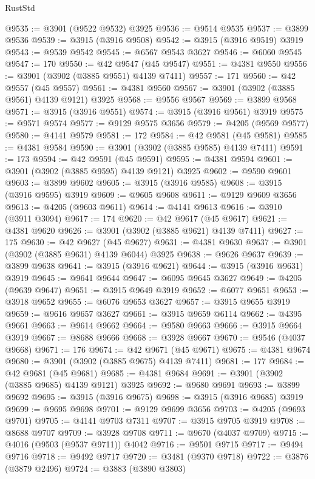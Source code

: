 \begin{lexlean}{RustStd}
\begin{coremodule}
@9535 := @3901 (@9522 @9532) @3925
@9536 := @9514 @9535
@9537 := @3899 @9536
@9539 := @3915 (@3916 @9508)
@9542 := @3915 (@3916 @9519) @3919
@9543 := @9539 @9542
@9545 := @6567 @9543 @3627
@9546 := @6060 @9545
@9547 := 170
@9550 := @42 @9547 (@45 @9547)
@9551 := @4381 @9550
@9556 := @3901 (@3902 (@3885 @9551) @4139 @7411)
@9557 := 171
@9560 := @42 @9557 (@45 @9557)
@9561 := @4381 @9560
@9567 := @3901 (@3902 (@3885 @9561) @4139 @9121) @3925
@9568 := @9556 @9567
@9569 := @3899 @9568
@9571 := @3915 (@3916 @9551)
@9574 := @3915 (@3916 @9561) @3919
@9575 := @9571 @9574
@9577 := @9129 @9575 @3656
@9579 := @4205 (@9569 @9577)
@9580 := @4141 @9579
@9581 := 172
@9584 := @42 @9581 (@45 @9581)
@9585 := @4381 @9584
@9590 := @3901 (@3902 (@3885 @9585) @4139 @7411)
@9591 := 173
@9594 := @42 @9591 (@45 @9591)
@9595 := @4381 @9594
@9601 := @3901 (@3902 (@3885 @9595) @4139 @9121) @3925
@9602 := @9590 @9601
@9603 := @3899 @9602
@9605 := @3915 (@3916 @9585)
@9608 := @3915 (@3916 @9595) @3919
@9609 := @9605 @9608
@9611 := @9129 @9609 @3656
@9613 := @4205 (@9603 @9611)
@9614 := @4141 @9613
@9616 := @3910 (@3911 @3094)
@9617 := 174
@9620 := @42 @9617 (@45 @9617)
@9621 := @4381 @9620
@9626 := @3901 (@3902 (@3885 @9621) @4139 @7411)
@9627 := 175
@9630 := @42 @9627 (@45 @9627)
@9631 := @4381 @9630
@9637 := @3901 (@3902 (@3885 @9631) @4139 @6044) @3925
@9638 := @9626 @9637
@9639 := @3899 @9638
@9641 := @3915 (@3916 @9621)
@9644 := @3915 (@3916 @9631) @3919
@9645 := @9641 @9644
@9647 := @6095 @9645 @3627
@9649 := @4205 (@9639 @9647)
@9651 := @3915 @9649 @3919
@9652 := @6077 @9651
@9653 := @3918 @9652
@9655 := @6076 @9653 @3627
@9657 := @3915 @9655 @3919
@9659 := @9616 @9657 @3627
@9661 := @3915 @9659 @6114
@9662 := @4395 @9661
@9663 := @9614 @9662
@9664 := @9580 @9663
@9666 := @3915 @9664 @3919
@9667 := @8688 @9666
@9668 := @3928 @9667
@9670 := @9546 (@4037 @9668)
@9671 := 176
@9674 := @42 @9671 (@45 @9671)
@9675 := @4381 @9674
@9680 := @3901 (@3902 (@3885 @9675) @4139 @7411)
@9681 := 177
@9684 := @42 @9681 (@45 @9681)
@9685 := @4381 @9684
@9691 := @3901 (@3902 (@3885 @9685) @4139 @9121) @3925
@9692 := @9680 @9691
@9693 := @3899 @9692
@9695 := @3915 (@3916 @9675)
@9698 := @3915 (@3916 @9685) @3919
@9699 := @9695 @9698
@9701 := @9129 @9699 @3656
@9703 := @4205 (@9693 @9701)
@9705 := @4141 @9703 @7311
@9707 := @3915 @9705 @3919
@9708 := @8688 @9707
@9709 := @3928 @9708
@9711 := @9670 (@4037 @9709)
@9715 := @4016 (@9503 (@9537 @9711)) @4042
@9716 := @9501 @9715
@9717 := @9494 @9716
@9718 := @9492 @9717
@9720 := @3481 (@9370 @9718)
@9722 := @3876 (@3879 @2496)
@9724 := @3883 (@3890 @3803)

\end{coremodule}
\end{lexlean}
